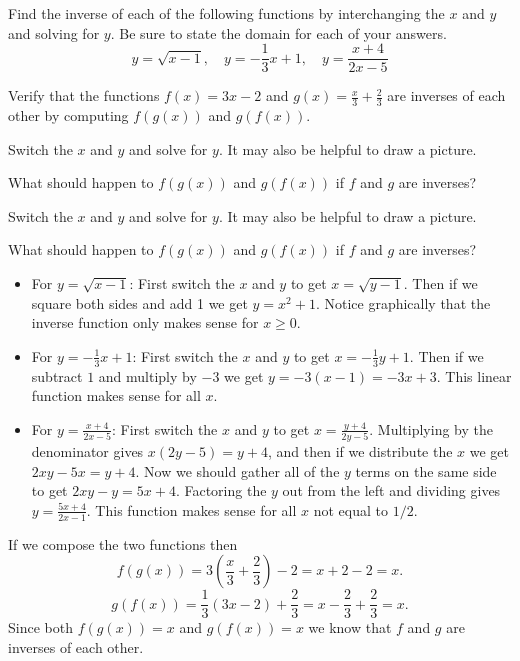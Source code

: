 \begin{activity}\label{A:0.3.4}
    \ba 
        \item Find the inverse of each of the following functions by interchanging the $x$ and $y$
    and solving for $y$.  Be sure to state the domain for each of your answers.
    \[ y = \sqrt{x-1}, \quad y = -\frac{1}{3} x + 1, \quad y = \frac{x+4}{2x-5} \]
\item Verify that the functions $f(x) = 3x-2$ and $g(x) = \frac{x}{3} +
    \frac{2}{3}$ are inverses of each other by computing $f(g(x))$ and $g(f(x))$.
    \ea
\end{activity}
\begin{smallhint}
    \ba
        \item Switch the $x$ and $y$ and solve for $y$.  It may also be helpful to draw a
            picture.
        \item What should happen to $f(g(x))$ and $g(f(x))$ if $f$ and $g$ are inverses?
    \ea
\end{smallhint}
\begin{bighint}
    \ba
        \item Switch the $x$ and $y$ and solve for $y$.  It may also be helpful to draw a
            picture.
        \item What should happen to $f(g(x))$ and $g(f(x))$ if $f$ and $g$ are inverses?
    \ea
\end{bighint}
\begin{activitySolution}
    \ba
\item 
    \begin{itemize}
        \item For $y=\sqrt{x-1}$: First switch the $x$ and $y$ to get $x = \sqrt{y-1}$.
            Then if we square both sides and add 1 we get $y = x^2 + 1$.  Notice
            graphically that the inverse function only makes sense for $x \ge 0$.
        \item For $y = -\frac{1}{3}x + 1$: First switch the $x$ and $y$ to get $x =
            -\frac{1}{3}y + 1$.  Then if we subtract $1$ and multiply by $-3$ we get $y =
            -3(x-1) = -3x+3$.  This linear function makes sense for all $x$.
        \item For $y=\frac{x+4}{2x-5}$: First switch the $x$ and $y$ to get $x =
            \frac{y+4}{2y-5}$.  Multiplying by the denominator gives $x(2y-5) = y+4$, and
            then if we distribute the $x$ we get $2xy - 5x = y+4$.  Now we should gather
            all of the $y$ terms on the same side to get $2xy - y = 5x + 4$.  Factoring
            the $y$ out from the left and dividing gives $y = \frac{5x+4}{2x-1}$. This
            function makes sense for all $x$ not equal to $1/2$.
    \end{itemize}
        \item If we compose the two functions then
            \[ f(g(x)) = 3\left( \frac{x}{3} + \frac{2}{3} \right) -2  = x + 2 -2 = x. \]
            \[ g(f(x)) = \frac{1}{3} \left( 3x-2 \right) + \frac{2}{3} = x -
                \frac{2}{3} + \frac{2}{3} = x. \]
            Since both $f(g(x)) = x$ and $g(f(x)) = x$ we know that $f$ and $g$ are
            inverses of each other.
    \ea
\end{activitySolution}

\aftera
